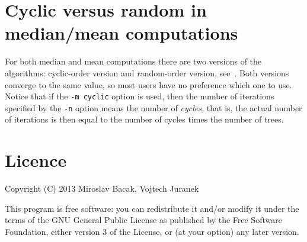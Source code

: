 \documentclass[a4paper,12pt]{amsart}
\begin{document}

\section{Cyclic versus random in median/mean computations} \label{sec:cycvran}
For both median and mean computations there are two versions of the algorithms: cyclic-order version and random-order version, see~\cite{mm}. Both versions converge to the same value, so most users have no preference which one to use. 
Notice that if the \texttt{-m cyclic} option is used, then the number of iterations specified by the \texttt{-n} option means the number of \emph{cycles,} that is, the actual number of iterations is then equal to the number of cycles times the number of trees.




\section{Licence}
Copyright (C) 2013 Miroslav Bacak, Vojtech Juranek

This program is free software: you can redistribute it and/or modify it under the terms of the GNU General Public License as published by the Free Software Foundation, either version 3 of the License, or (at your option) any later version.
\end{document}
